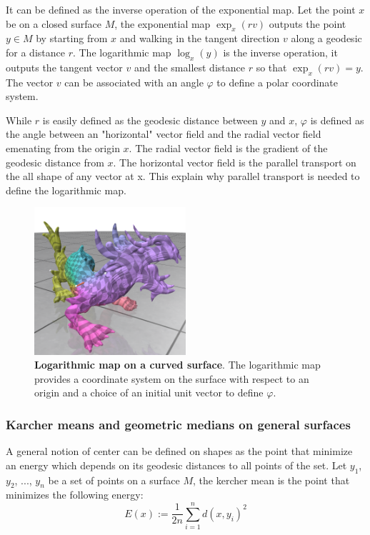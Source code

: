 \documentclass[sigconf]{acmart}
\begin{document}
It can be defined as the inverse operation of the exponential map. Let the point $x$ be on a closed surface $M$, the exponential map $\exp_x (rv)$ outputs the point $y\in M$ by starting from $x$ and walking in the tangent direction $v$ along a geodesic for a distance $r$. The logarithmic map $\log_x(y)$ is the inverse operation, it outputs the tangent vector $v$ and the smallest distance $r$ so that $\exp_x (rv)=y$. The vector $v$ can be associated with an angle $\varphi$ to define a polar coordinate system.

While $r$ is easily defined as the geodesic distance between $y$ and $x$, $\varphi$ is defined as the angle between an "horizontal" vector field and the radial vector field emenating from the origin $x$. The radial vector field is the gradient of the geodesic distance from $x$. The horizontal vector field is the parallel transport on the all shape of any vector at x. This explain why parallel transport is needed to define the logarithmic map. 

\begin{figure}[h]
  \centering
  \includegraphics[width=0.5\textwidth]{dragon_log_map.png}
  \caption{\textbf{Logarithmic map on a curved surface}. \textmd{The logarithmic map provides a coordinate system on the surface with respect to an origin and a choice of an initial unit vector to define $\varphi$.}}
  \label{fig:logarithmic_map}
\end{figure}


\subsubsection{Karcher means and geometric medians on general surfaces }
A general notion of center can be defined on shapes as the point that minimize an energy which depends on its geodesic distances to all points of the set. 
Let $y_1$, $y_2$, ..., $y_n$ be a set of points on a surface $M$, the kercher mean is the point that minimizes the following energy:
$$E(x):=\frac{1}{2n}\sum_{i=1}^{n}d(x,y_i)^2$$
\end{document}
